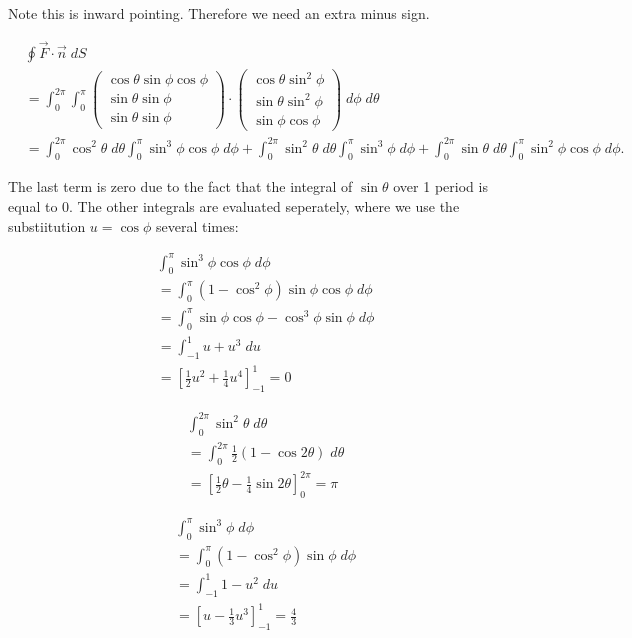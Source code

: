 \documentclass[11pt]{article}
\begin{document}
\begin{solution}
Note this is inward pointing. Therefore we need an extra minus sign.

    \begin{align*}
        &
        \oint \vec{F}\cdot \vec{n} \;dS
        \\&
        =
        \int_{0}^{2\pi}\int_0^{\pi} \begin{pmatrix}\cos\theta\sin\phi\cos\phi\\ \sin\theta\sin\phi \\ \sin\theta\sin\phi \end{pmatrix}\cdot\begin{pmatrix} \cos\theta\sin^2\phi\\ \sin\theta\sin^2\phi \\\sin\phi\cos\phi \end{pmatrix} \;d\phi\;d\theta
        \\&
        =
        \int_{0}^{2\pi}\cos^2\theta\;d\theta\int_0^{\pi}\sin^3\phi\cos\phi\;d\phi + \int_{0}^{2\pi}\sin^2\theta\;d\theta\int_0^{\pi}\sin^3\phi\;d\phi +  \int_{0}^{2\pi}\sin\theta\;d\theta\int_0^{\pi}\sin^2\phi\cos\phi\;d\phi
        .
    \end{align*}

The last term is zero due to the fact that the integral of $\sin\theta$ over 1 period is equal to $0$. The other integrals are evaluated seperately, where we use the substiitution $u = \cos\phi$ several times:

    \begin{align*}
        &
        \int_0^{\pi}\sin^3\phi\cos\phi\;d\phi 
        \\&
	  = \int_0^{\pi}(1 - \cos^2\phi)\sin\phi\cos\phi\;d\phi 
	  \\&
	  = \int_0^{\pi}\sin\phi\cos\phi - \cos^3\phi\sin\phi\;d\phi 	
	  \\&
	  = \int_{-1}^1 u + u^3 \;d u  
	  \\&
	  = \left[\frac{1}{2} u^2 +\frac{1}{4}u^4\right]_{-1}^{1} = 0
    \end{align*}

    \begin{align*}
        &
        \int_0^{2\pi}\sin^2\theta\;d\theta
        \\&
	  = \int_0^{2\pi}\frac{1}{2}(1-\cos2\theta)\;d\theta 
	  \\&
	  = \left[\frac{1}{2} \theta -\frac{1}{4}\sin2\theta\right]_{0}^{2\pi} = \pi
    \end{align*}

    \begin{align*}
        &
        \int_0^{\pi}\sin^3\phi\;d\phi 
        \\&
	  = \int_0^{\pi}(1 - \cos^2\phi)\sin\phi\;d\phi 
	  \\&
	  = \int_{-1}^1 1 - u^2 \;d u  
	  \\&
	  = \left[ u - \frac{1}{3}u^3\right]_{-1}^{1} = \frac{4}{3}
    \end{align*}
\end{solution}
\end{document}
